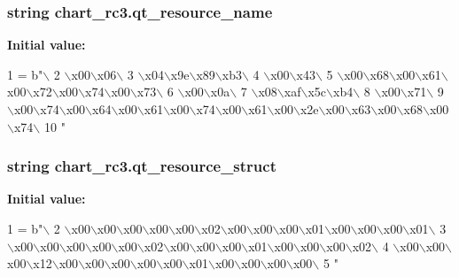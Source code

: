 \subsubsection[{qt\+\_\+resource\+\_\+name}]{\setlength{\rightskip}{0pt plus 5cm}string chart\+\_\+rc3.\+qt\+\_\+resource\+\_\+name}\label{namespacechart__rc3_a58117fa1385438aac8becbe7fa4fb4f2}
{\bfseries Initial value\+:}
\begin{DoxyCode}
1 = b\textcolor{stringliteral}{"\(\backslash\)}
2 \textcolor{stringliteral}{\(\backslash\)x00\(\backslash\)x06\(\backslash\)}
3 \textcolor{stringliteral}{\(\backslash\)x04\(\backslash\)x9e\(\backslash\)x89\(\backslash\)xb3\(\backslash\)}
4 \textcolor{stringliteral}{\(\backslash\)x00\(\backslash\)x43\(\backslash\)}
5 \textcolor{stringliteral}{\(\backslash\)x00\(\backslash\)x68\(\backslash\)x00\(\backslash\)x61\(\backslash\)x00\(\backslash\)x72\(\backslash\)x00\(\backslash\)x74\(\backslash\)x00\(\backslash\)x73\(\backslash\)}
6 \textcolor{stringliteral}{\(\backslash\)x00\(\backslash\)x0a\(\backslash\)}
7 \textcolor{stringliteral}{\(\backslash\)x08\(\backslash\)xaf\(\backslash\)x5c\(\backslash\)xb4\(\backslash\)}
8 \textcolor{stringliteral}{\(\backslash\)x00\(\backslash\)x71\(\backslash\)}
9 \textcolor{stringliteral}{\(\backslash\)x00\(\backslash\)x74\(\backslash\)x00\(\backslash\)x64\(\backslash\)x00\(\backslash\)x61\(\backslash\)x00\(\backslash\)x74\(\backslash\)x00\(\backslash\)x61\(\backslash\)x00\(\backslash\)x2e\(\backslash\)x00\(\backslash\)x63\(\backslash\)x00\(\backslash\)x68\(\backslash\)x00\(\backslash\)x74\(\backslash\)}
10 \textcolor{stringliteral}{"}
\end{DoxyCode}
\hypertarget{namespacechart__rc3_a62bbac598458cdb9e1890ce0bd0af05e}{}
\subsubsection[{qt\+\_\+resource\+\_\+struct}]{\setlength{\rightskip}{0pt plus 5cm}string chart\+\_\+rc3.\+qt\+\_\+resource\+\_\+struct}\label{namespacechart__rc3_a62bbac598458cdb9e1890ce0bd0af05e}
{\bfseries Initial value\+:}
\begin{DoxyCode}
1 = b\textcolor{stringliteral}{"\(\backslash\)}
2 \textcolor{stringliteral}{\(\backslash\)x00\(\backslash\)x00\(\backslash\)x00\(\backslash\)x00\(\backslash\)x00\(\backslash\)x02\(\backslash\)x00\(\backslash\)x00\(\backslash\)x00\(\backslash\)x01\(\backslash\)x00\(\backslash\)x00\(\backslash\)x00\(\backslash\)x01\(\backslash\)}
3 \textcolor{stringliteral}{\(\backslash\)x00\(\backslash\)x00\(\backslash\)x00\(\backslash\)x00\(\backslash\)x00\(\backslash\)x02\(\backslash\)x00\(\backslash\)x00\(\backslash\)x00\(\backslash\)x01\(\backslash\)x00\(\backslash\)x00\(\backslash\)x00\(\backslash\)x02\(\backslash\)}
4 \textcolor{stringliteral}{\(\backslash\)x00\(\backslash\)x00\(\backslash\)x00\(\backslash\)x12\(\backslash\)x00\(\backslash\)x00\(\backslash\)x00\(\backslash\)x00\(\backslash\)x00\(\backslash\)x01\(\backslash\)x00\(\backslash\)x00\(\backslash\)x00\(\backslash\)x00\(\backslash\)}
5 \textcolor{stringliteral}{"}
\end{DoxyCode}
